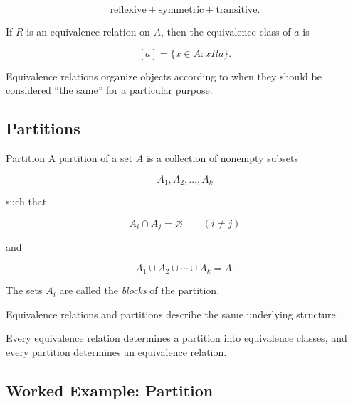 \[
\boxed{
\text{reflexive}
+
\text{symmetric}
+
\text{transitive}.
}
\]

If \(R\) is an equivalence relation on \(A\), then the equivalence class
of \(a\) is

\[
\boxed{
[a]
=
\{x\in A:xRa\}.
}
\]

Equivalence relations organize objects according to when they should be
considered ``the same'' for a particular purpose.

\subsection{Partitions}
\label{subsec:partitions-discrete}

\begin{definitionbox}{Partition}
A partition of a set \(A\) is a collection of nonempty subsets

\[
A_1,A_2,\ldots,A_k
\]

such that

\[
A_i\cap A_j=\varnothing
\qquad
(i\neq j)
\]

and

\[
\boxed{
A_1\cup A_2\cup\cdots\cup A_k=A.
}
\]
\end{definitionbox}

The sets \(A_i\) are called the \emph{blocks} of the partition.

Equivalence relations and partitions describe the same underlying
structure.

Every equivalence relation determines a partition into equivalence
classes, and every partition determines an equivalence relation.

\subsection{Worked Example: Partition}
\label{subsec:worked-partition}

